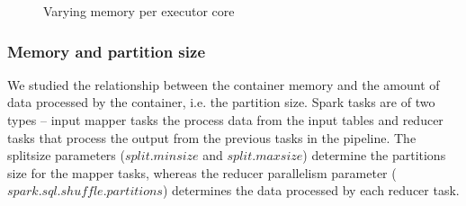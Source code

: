 \begin{figure}[ht]
  \caption{Varying memory per executor core \protect\footnotemark[1]}\label{fig:varymem}
\endminipage
{}
\end{figure}

\subsubsection*{Memory and partition size}
We studied the relationship between the container memory and the amount of data processed by the container, i.e. the partition size.  Spark tasks are of two types -- input mapper tasks the process data from the input tables and reducer tasks that process the output from the previous tasks in the pipeline. The splitsize parameters ($split.minsize$ and $split.maxsize$) determine the partitions size for the mapper tasks, whereas the reducer parallelism parameter ($spark.sql.shuffle.partitions$) determines the data processed by each reducer task.


